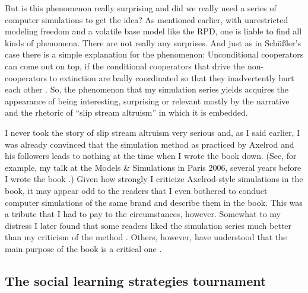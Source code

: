 \documentclass[graybox, English]{svmult}
\begin{document}
But is this phenomenon really surprising and did we really need a
series of computer simulations to get the idea? As mentioned earlier,
with unrestricted modeling freedom and a volatile base model like the
RPD, one is liable to find all kinds of phenomena. There are not
really any surprises. And just as in Schüßler's case there is a simple
explanation for the phenomenon: Unconditional cooperators can come out
on top, if the conditional cooperators that drive the non-cooperators
to extinction are badly coordinated so that they inadvertently hurt
each other \citep[113]{arnold:2008}. So, the phenomenon that my
simulation series yields acquires the appearance of being interesting,
surprising or relevant mostly by the narrative and the rhetoric of
``slip stream altruism'' in which it is embedded. 

I never took the story of slip stream altruism very serious and, as I
said earlier, I was already convinced that the simulation method as
practiced by Axelrod and his followers leads to nothing at the time when
I wrote the book down.  (See, for example, my talk at the Models \&
Simulations in Paris 2006, several years before I wrote the book
\citep{Arnold2006}.)  Given how strongly I criticize Axelrod-style
simulations in the book, it may appear odd to the readers that I even
bothered to conduct computer simulations of the same brand and
describe them in the book.  This was a tribute that I had to pay to
the circumstances, however. Somewhat to my distress I later found that
some readers liked the simulation series much better than my
criticism of the method \citep[344, 356]{schurz:2011}. Others,
however, have understood that the main purpose of the book is a
critical one \citep{zollman:2009}. 

\subsection{The social learning strategies tournament}
\end{document}
